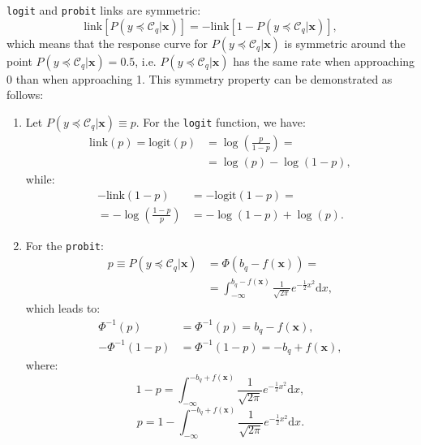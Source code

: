 \documentclass[journal]{IEEEtran}
\begin{document}
	\texttt{logit} and \texttt{probit} links are symmetric:	
	\begin{equation}
	\nonumber
	\text{link}[P(y \preceq \mathcal{C}_q | \mathbf{x})] = -\text{link}[1 - P(y \preceq \mathcal{C}_q | \mathbf{x})],
	\end{equation}
	which means that the response curve for $P(y \preceq \mathcal{C}_q | \mathbf{x})$ is symmetric around the point $P(y \preceq \mathcal{C}_q | \mathbf{x}) = 0.5$, i.e. $P(y \preceq \mathcal{C}_q | \mathbf{x})$ has the same rate when approaching 0 than when approaching 1. This symmetry property can be demonstrated as follows:	
	\begin{enumerate}
		\item Let $P(y \preceq \mathcal{C}_q | \mathbf{x}) \equiv p$. For the \texttt{logit} function, we have:
		\begin{equation}
		\nonumber
		\begin{aligned}
		\text{link}(p) = \text{logit}(p) &= \log\left(\frac{p}{1-p}\right) =\\
		&= \log(p) - \log(1-p),
		\end{aligned}
		\end{equation}			
		while:			
		\begin{equation}
		\nonumber
		\begin{aligned}
		-\text{link}(1 - p) &= -\text{logit}(1 - p) =\\
		=- \log\left(\frac{1- p}{p}\right) &= - \log(1 - p) + \log(p).
		\end{aligned}
		\end{equation}
		
		\item For the \texttt{probit}:		
		\begin{equation}
		\nonumber
		\begin{aligned}
		p \equiv P(y \preceq \mathcal{C}_q | \mathbf{x}) &= \Phi(b_q - f(\mathbf{x})) =\\
		&= \int_{-\infty}^{b_q - f(\mathbf{x})} \frac{1}{\sqrt{2\pi}} e^{-\frac{1}{2}x^2} \mathrm{d}x,
		\end{aligned}
		\end{equation}
		which leads to:
		\begin{align}
		\nonumber \Phi^{-1}(p) & = \Phi^{-1}(p) = b_q - f(\mathbf{x}),\\
		\nonumber -\Phi^{-1}(1-p) &= \Phi^{-1}(1-p) = -b_q + f(\mathbf{x}),
		\end{align}
		where:		
		\begin{equation}
		\nonumber
		1 - p = \int_{-\infty}^{-b_q + f(\mathbf{x})} \frac{1}{\sqrt{2\pi}} e^{-\frac{1}{2}x^2} \mathrm{d}x,
		\end{equation}
		\begin{equation}
		\nonumber
		p = 1 - \int_{-\infty}^{-b_q + f(\mathbf{x})} \frac{1}{\sqrt{2\pi}} e^{-\frac{1}{2}x^2} \mathrm{d}x.
		\end{equation}
	\end{enumerate}
	
\end{document}
